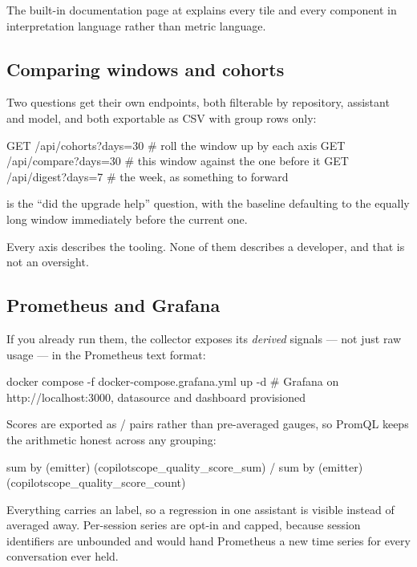 \documentclass[11pt,a4paper]{article}
\newcommand{\code}[1]{\texttt{\detokenize{#1}}}
\begin{document}
The built-in documentation page at \code{/docs} explains every tile and every
component in interpretation language rather than metric language.

\subsection{Comparing windows and cohorts}

Two questions get their own endpoints, both filterable by repository, assistant
and model, and both exportable as CSV with group rows only:

\begin{shell}
GET /api/cohorts?days=30      # roll the window up by each axis
GET /api/compare?days=30      # this window against the one before it
GET /api/digest?days=7        # the week, as something to forward
\end{shell}

\code{/api/compare} is the ``did the upgrade help'' question, with the baseline
defaulting to the equally long window immediately before the current one.

Every axis describes the tooling. None of them describes a developer, and that
is not an oversight.

\subsection{Prometheus and Grafana}

If you already run them, the collector exposes its \emph{derived} signals --- not
just raw usage --- in the Prometheus text format:

\begin{shell}
docker compose -f docker-compose.grafana.yml up -d
# Grafana on http://localhost:3000, datasource and dashboard provisioned
\end{shell}

Scores are exported as \code{_sum}/\code{_count} pairs rather than
pre-averaged gauges, so PromQL keeps the arithmetic honest across any grouping:

\begin{shell}
sum by (emitter) (copilotscope_quality_score_sum)
  / sum by (emitter) (copilotscope_quality_score_count)
\end{shell}

Everything carries an \code{emitter} label, so a regression in one assistant is
visible instead of averaged away. Per-session series are opt-in and capped,
because session identifiers are unbounded and would hand Prometheus a new time
series for every conversation ever held.
\end{document}
